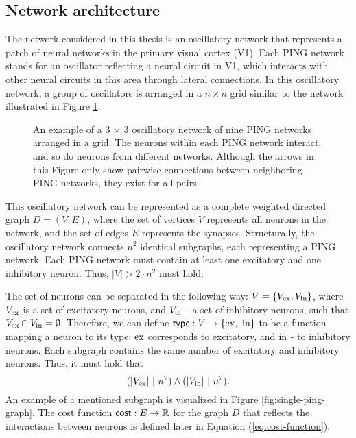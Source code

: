 \subsection{Network architecture}
\label{sec:grid-network}

The network considered in this thesis is an oscillatory network that represents a patch of neural networks in the primary visual cortex (V1). Each PING network stands for an oscillator reflecting a neural circuit in V1, which interacts with other neural circuits in this area through lateral connections.
In this oscillatory network, a group of oscillators is arranged in a $n \times n$ grid similar to the network illustrated in Figure \ref{fig:oscillatory-grid-graph}.

\begin{figure}[!htp]
    \centering
    
    \caption[Grid oscillatory network]{An example of a 3 $\times$ 3 oscillatory network of nine PING networks arranged in a grid. The neurons within each PING network interact, and so do neurons from different networks. Although the arrows in this Figure only show pairwise connections between neighboring PING networks, they exist for all pairs.}
    \label{fig:oscillatory-grid-graph}
\end{figure}

This oscillatory network can be represented as a complete weighted directed graph $D = (V, E)$, where the set of vertices $V$ represents all neurons in the network, and the set of edges $E$ represents the synapses. Structurally, the oscillatory network connects $n^2$ identical subgraphs, each representing a PING network. Each PING network must contain at least one excitatory and one inhibitory neuron. Thus, $|V| > 2 \cdot n^2$ must hold.

The set of neurons can be separated in the following way: $V = \{ V_{\mathrm{ex}}, V_{\mathrm{in}}\}$, where $V_{\mathrm{ex}}$ is a set of excitatory neurons, and $V_{\mathrm{in}}$ - a set of inhibitory neurons, such that $V_{\mathrm{ex}} \cap V_{\mathrm{in}} = \emptyset$.
Therefore, we can define $\mathsf{type}: V \to \{ \mathrm{ex}, \ \mathrm{in} \}$ to be a function mapping a neuron to its type: $\mathrm{ex}$ corresponds to excitatory, and $\mathrm{in}$ - to inhibitory neurons. Each subgraph contains the same number of excitatory and inhibitory neurons. Thus, it must hold that
\begin{equation}
    (|V_{\mathrm{ex}}| \ | \ n^2) \land (|V_{\mathrm{in}}| \ | \ n^2).
\end{equation}
An example of a mentioned subgraph is visualized in Figure \ref{fig:single-ping-graph}. 
The cost function $\mathsf{cost}: E \to \mathbb{R}$ for the graph $D$ that reflects the interactions between neurons is defined later in Equation (\ref{eq:cost-function}).


